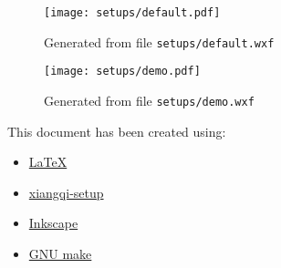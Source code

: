 \documentclass[a4paper]{article}
\begin{document}
\begin{figure}[H]
    \centering
    \texttt{[image: setups/default.pdf]}
    \caption{Generated from file \texttt{setups/default.wxf}}
\end{figure}

\begin{figure}[H]
    \centering
    \texttt{[image: setups/demo.pdf]}
    \caption{Generated from file \texttt{setups/demo.wxf}}
\end{figure}

\noindent
This document has been created using:
\begin{itemize}
    \item \href{https://www.latex-project.org/}{\LaTeX}
    \item \href{https://github.com/hartwork/xiangqi-setup}{xiangqi-setup}
    \item \href{https://inkscape.org/}{Inkscape}
    \item \href{https://www.gnu.org/software/make/}{GNU make}
\end{itemize}
\end{document}

